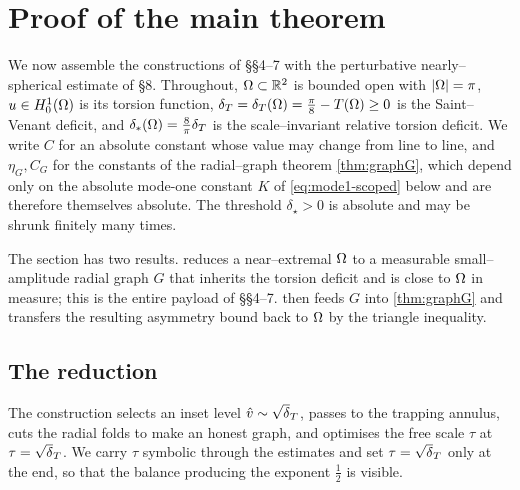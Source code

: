 \section{Proof of the main theorem}
\label{sec:main}

We now assemble the constructions of \S\S4--7 with the perturbative
nearly--spherical estimate of \S8. Throughout, $\Omega\subset\mathbb{R}^2$ is bounded
open with $\left\lvert\Omega\right\rvert=\pi$, $u\in H^1_0(\Omega)$ is its torsion function, $\delta_T=\delta_T(\Omega)=
\tfrac\pi8-T(\Omega)\ge0$ is the Saint--Venant deficit, and $\delta_{*}(\Omega)=
\tfrac8\pi\delta_T$ is the scale--invariant relative torsion deficit. We write
$C$ for an absolute constant whose value may change from line to line, and
$\eta_G,C_G$ for the constants of the radial--graph theorem
\cref{thm:graphG}, which depend only on the absolute mode-one constant $K$ of
\eqref{eq:mode1-scoped} below and are therefore themselves absolute. The
threshold $\delta_\star>0$ is absolute and may be shrunk finitely many times.

The section has two results.  reduces a near--extremal
$\Omega$ to a measurable small--amplitude radial graph $G$ that inherits the
torsion deficit and is close to $\Omega$ in measure; this is the entire payload
of \S\S4--7.  then feeds $G$ into \cref{thm:graphG} and
transfers the resulting asymmetry bound back to $\Omega$ by the triangle
inequality.

\subsection{The reduction}

The construction selects an inset level $\hat v\sim\sqrt\dT$, passes to the
trapping annulus, cuts the radial folds to make an honest graph, and
optimises the free scale $\tau$ at $\tau=\sqrt\dT$. We carry $\tau$ symbolic
through the estimates and set $\tau=\sqrt\dT$ only at the end, so that the
balance producing the exponent $\tfrac12$ is visible.

